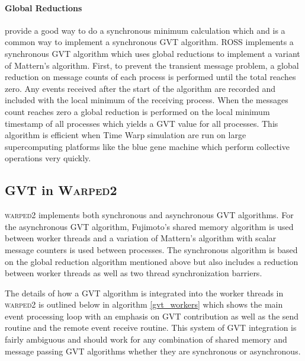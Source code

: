 \documentclass[11pt]{book}
\begin{document}
\paragraph{Global Reductions} provide a good way to do a synchronous minimum calculation
which and is a common way to implement a synchronous GVT algorithm.  ROSS implements a
synchronous GVT algorithm which uses global reductions to implement a variant of Mattern's
algorithm\cite{holder-08}.  First, to prevent the transient message problem, a global reduction
on message counts of each process is performed until the total reaches zero.  Any events received
after the start of the algorithm are recorded and included with the local minimum of the receiving
process.  When the messages count reaches zero a global reduction is performed on the local minimum
timestamp of all processes which yields a GVT value for all processes.  This algorithm is efficient
when Time Warp simulation are run on large supercomputing platforms like the blue gene machine
which perform collective operations very quickly.

\subsection{GVT in \textsc{Warped2}}

\textsc{warped2} implements both synchronous and asynchronous GVT algorithms.  For the
asynchronous GVT algorithm, Fujimoto's shared memory algorithm is used between worker threads
and a variation of Mattern's algorithm with scalar message counters is used between processes.
The synchronous algorithm is based on the global reduction algorithm mentioned above but also
includes a reduction between worker threads as well as two thread synchronization barriers.

The details of how a GVT algorithm is integrated into the worker threads in \textsc{warped2}
is outlined below in algorithm \ref{gvt_workers} which shows the main event processing loop
with an emphasis on GVT contribution as well as the send routine and the remote event receive
routine.  This system of GVT integration is fairly ambiguous and should work for any combination of
shared memory and message passing GVT algorithms whether they are synchronous or asynchronous.
\end{document}
